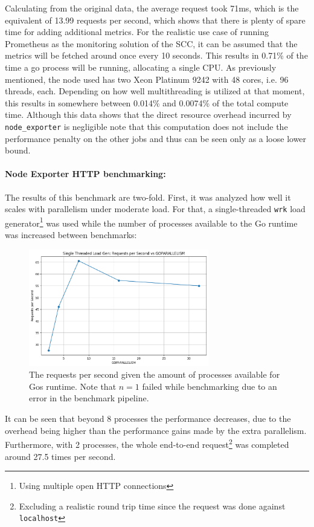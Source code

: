 Calculating from the original data, the average request took 71ms, which is the equivalent of 13.99 requests per second, which shows that there is plenty of spare time for adding additional metrics. For the realistic use case of running Prometheus as the monitoring solution of the \ac{SCC}, it can be assumed that the metrics will be fetched around once every 10 seconds. This results in 0.71\% of the time a go process will be running, allocating a single CPU. As previously mentioned, the node used has two Xeon Platinum 9242 with 48 cores, i.e. 96 threads, each. Depending on how well multithreading is utilized at that moment, this results in somewhere between 0.014\% and 0.0074\% of the total compute time. Although this data shows that the direct resource overhead incurred by \texttt{node\_exporter} is negligible note that this computation does not include the performance penalty on the other jobs and thus can be seen only as a loose lower bound.\\

\paragraph{Node Exporter HTTP benchmarking:} The results of this benchmark are two-fold. First, it was analyzed how well it scales with parallelism under moderate load. For that, a single-threaded \texttt{wrk} load generator\footnote{Using multiple open HTTP connections} was used while the number of processes available to the Go runtime was increased between benchmarks:

\begin{figure}[H]
  \centering
  \includegraphics[width=0.7\textwidth]{./plots/node_exporter_performance_per_parallelism.png}
  \caption{The requests per second given the amount of processes available for Gos runtime. Note that $n=1$ failed while benchmarking due to an error in the benchmark pipeline.}
\end{figure}
It can be seen that beyond 8 processes the performance decreases, due to the overhead being higher than the performance gains made by the extra parallelism. Furthermore, with 2 processes, the whole end-to-end request\footnote{Excluding a realistic round trip time since the request was done against \texttt{localhost}} was completed around 27.5 times per second.\\


